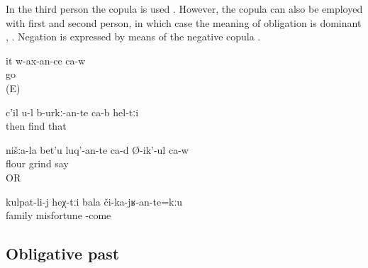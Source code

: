 In the third person the copula is used . However, the copula can also be employed with first and second person, in which case the meaning of obligation is dominant , . Negation is expressed by means of the negative copula .
%
\begin{exe}
	\ex	\label{ex:He will go / have to go E}
	\gll	it	w-ax-an-ce	ca-w\\
			go	\\
	\glt	{} (E)

	\ex	\label{ex:Then you have to find them analytic}
	\gll	c'il	u-l	b-urkː-an-te	ca-b	hel-tːi\\
		then		find 		that\\
	\glt	{}

	\ex	\label{ex:Our flour we should / (will) grind, he says analytic}
	\gll	nišːa-la	bet'u	luq'-an-te ca-d	Ø-ik'-ul	ca-w\\
			flour	grind 		say	\\
	\glt	{} OR 

	\ex	\label{ex:‎To a family such misfortune should not happen analytic}
	\gll	kulpat-li-j	heχ-tːi	bala	či-ka-jʁ-an-te=kːu\\
		family		misfortune	-come\\
	\glt	{}
\end{exe}



\subsection{Obligative past}
\label{ssec:Obligative past}


